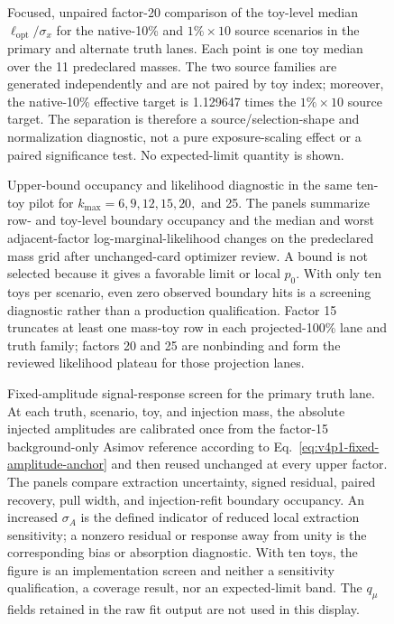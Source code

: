 {\begin{figure}[H]
\centering
{}
\caption{Focused, unpaired factor-20 comparison of the toy-level median
$\ell_{\mathrm{opt}}/\sigma_x$ for the native-10\% and
$1\%\times10$ source scenarios in the primary and alternate truth lanes. Each point
is one toy median over the 11 predeclared masses. The two source families are generated
independently and are not paired by toy index; moreover, the native-10\% effective
target is 1.129647 times the $1\%\times10$ source target. The separation is therefore
a source/selection-shape and normalization diagnostic, not a pure exposure-scaling
effect or a paired significance test. No expected-limit quantity is shown.}
\label{fig:v4p1-ls-factor20-native10-vs-1pct-x10}
\end{figure}

\begin{figure}[H]
\centering
{}
\caption{Upper-bound occupancy and likelihood diagnostic in the same ten-toy pilot for
$k_{\max}=6,9,12,15,20,$ and 25. The panels summarize row- and toy-level boundary
occupancy and the median and worst adjacent-factor log-marginal-likelihood changes
on the predeclared mass grid after unchanged-card optimizer review. A bound is not
selected because it gives a favorable limit or local $p_0$. With only ten toys per
scenario, even zero observed boundary hits is a screening diagnostic rather than a
production qualification. Factor 15 truncates at least one mass-toy row in each
projected-100\% lane and truth family; factors 20 and 25 are nonbinding and form the
reviewed likelihood plateau for those projection lanes.}
\label{fig:v4p1-ls-bound-sensitivity}
\end{figure}

\begin{figure}[H]
\centering
{}
\caption{Fixed-amplitude signal-response screen for the primary truth lane. At each
truth, scenario, toy, and injection mass, the absolute injected amplitudes are
calibrated once from the factor-15 background-only Asimov reference according to
Eq.~\eqref{eq:v4p1-fixed-amplitude-anchor} and then reused unchanged at every upper
factor. The panels compare extraction uncertainty, signed residual, paired recovery,
pull width, and injection-refit boundary occupancy. An increased $\sigma_A$ is the
defined indicator of reduced local extraction sensitivity; a nonzero residual or
response away from unity is the corresponding bias or absorption diagnostic. With
ten toys, the figure is an implementation screen and neither a sensitivity
qualification, a coverage result, nor an expected-limit band. The $q_\mu$ fields
retained in the raw fit output are not used in this display.}
\label{fig:v4p1-ls-fixed-amplitude-response}
\end{figure}

}
